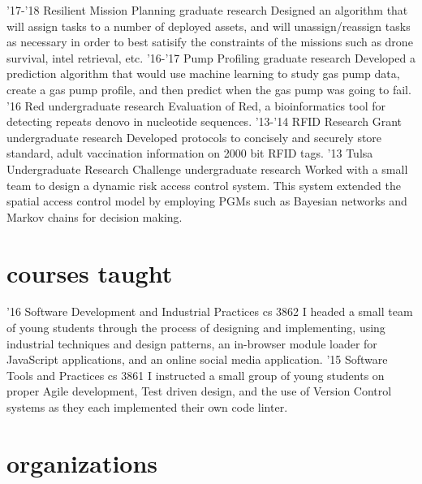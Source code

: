 \documentclass[print]{friggeri-cv}
\begin{document}
\begin{entrylist}
  \entry
	{'17-'18}
	{Resilient Mission Planning}
	{graduate research}
	{Designed an algorithm that will assign tasks to a number of deployed assets, and will unassign/reassign tasks as necessary in order to best satisify the constraints of the missions such as drone survival, intel retrieval, etc.}
  \entry
	{'16-'17}
	{Pump Profiling}
	{graduate research}
	{Developed a prediction algorithm that would use machine learning to study gas pump data, create a gas pump profile, and then predict when the gas pump was going to fail.}
  \entry
    {'16}
    {Red}
    {undergraduate research}
    {Evaluation of Red, a bioinformatics tool for detecting repeats denovo in nucleotide sequences.}
  \entry
    {'13-'14}
    {RFID Research Grant}
    {undergraduate research}
    {Developed protocols to concisely and securely store standard, adult vaccination information on 2000 bit RFID tags.}
  \entry
    {'13}
    {Tulsa Undergraduate Research Challenge}
    {undergraduate research}
    {Worked with a small team to design a dynamic risk access control system. This system extended the spatial access control model by employing PGMs such as Bayesian networks and Markov chains for decision making.}
\end{entrylist}

\section{courses taught}

\begin{entrylist}
  \entry
    {'16}
    {Software Development and Industrial Practices}
    {cs 3862}
    {I headed a small team of young students through the process of designing and implementing, using industrial techniques and design patterns, an in-browser module loader for JavaScript applications, and an online social media application.}
  \entry
    {'15}
    {Software Tools and Practices}
    {cs 3861}
    {I instructed a small group of young students on proper Agile development, Test driven design, and the use of Version Control systems as they each implemented their own code linter.}
\end{entrylist}

\section{organizations}
\end{document}
